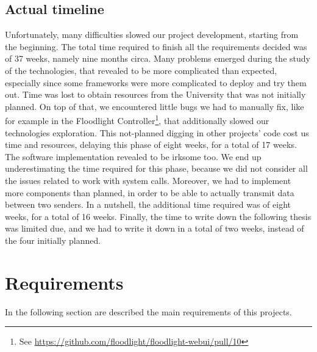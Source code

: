 \subsection{Actual timeline}
Unfortunately, many difficulties slowed our project development, starting from
the beginning. The total time required to finish all the requirements decided
was of 37 weeks, namely nine months circa. Many problems emerged during the
study of the technologies, that revealed to be more complicated than expected,
especially since some frameworks were more complicated to deploy and try them
out. Time was lost to obtain resources from the University that was not
initially planned. On top of that, we encountered little bugs we had to manually
fix, like for example in the Floodlight Controller\footnote{See
  \url{https://github.com/floodlight/floodlight-webui/pull/10}}, that
additionally slowed our technologies exploration. This not-planned digging in
other projects' code cost us time and resources, delaying this phase of eight
weeks, for a total of 17 weeks. The software implementation revealed to be
irksome too. We end up underestimating the time required for this phase, because
we did not consider all the issues related to work with system calls. Moreover,
we had to implement more components than planned, in order to be able to
actually transmit data between two senders. In a nutshell, the additional time
required was of eight weeks, for a total of 16 weeks. Finally, the time to write
down the following thesis was limited due, and we had to write it down in a
total of two weeks, instead of the four initially planned.

\section{Requirements}\label{chap:prjan:sec:req}
In the following section are described the main requirements of this projects.

